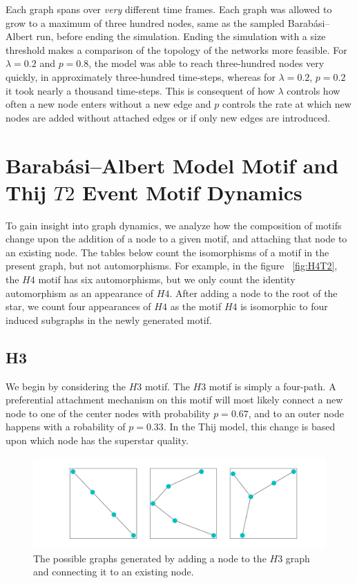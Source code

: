 Each graph spans over \textit{very} different
time frames. Each graph was allowed to grow to a maximum of three hundred nodes, same as the
sampled Barabási–Albert run, before ending the simulation. Ending the simulation with a size
threshold makes a comparison of the topology of the networks more feasible. For $\lambda=0.2$ and $p=0.8$, the model was able to reach 
three-hundred nodes very quickly, in approximately three-hundred time-steps, whereas for $\lambda=0.2$, $p=0.2$ it took nearly a thousand time-steps. This is consequent of how $\lambda$ controls how often a new node enters without a new edge and
$p$ controls the rate at which new nodes are added without attached edges or if only new edges are introduced. 

\chapter{Barabási–Albert Model Motif and Thij $T2$ Event Motif Dynamics}

To gain insight into graph dynamics, we analyze how the composition of motifs change 
upon the addition of a node to a given motif, and attaching that node to an existing node. 
The tables below count the isomorphisms of a motif in the present graph, but not automorphisms.
For example, in the figure ~\ref{fig:H4T2}, the $H4$ motif has six automorphisms, but we only count the identity automorphism as 
an appearance of $H4$. After adding a node to the root of the star, we count four appearances 
of $H4$ as the motif $H4$ is isomorphic to four induced subgraphs in the newly generated motif. 

\section{H3}
We begin by considering the $H3$ motif. The $H3$ motif is simply a four-path. A preferential attachment
mechanism on this motif will most likely connect a new node to one of the center nodes with probability
$p=0.67$, and to an outer node happens with a robability of $p=0.33$. In the Thij model,
this change is based upon which node has the superstar quality. 

\begin{figure}[!ht]
    \includegraphics[width=16cm]{Images/H3_evolution.png}
    \centering
    \caption{The possible graphs generated by adding a node to the $H3$ graph 
    and connecting it to an existing node.}
\end{figure}
\FloatBarrier

